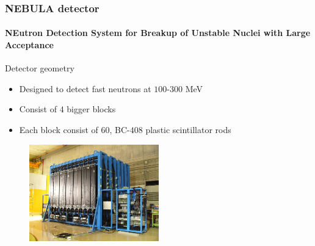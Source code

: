 \begin{frame}
\frametitle{NEBULA detector}
\framesubtitle{\textbf{NE}utron Detection System for \textbf{B}reakup of \textbf{U}nstable Nuclei with \textbf{L}arge \textbf{A}cceptance}

\begin{block}{Detector geometry}
	\begin{itemize}
		\item Designed to detect fast neutrons at $100$-$300$ MeV
		\item Consist of $4$ bigger blocks
		\item Each block consist of $60$, BC-$408$ plastic scintillator rods
	\end{itemize}
\end{block}

\begin{figure}
	\includegraphics[width=0.5\textwidth]{images/nebula_detector.jpg}
\end{figure}

\end{frame}